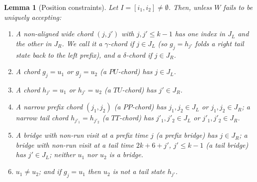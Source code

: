 \documentclass[11pt]{article}
\newtheorem{lemma}[theorem]{Lemma}
\theoremstyle{definition}
\begin{document}
\begin{lemma}[Position constraints]\label{lem:positions}
Let $I=[i_1,i_2]\ne\emptyset$. Then, unless $W$ fails to be uniquely
accepting:
\begin{enumerate}[leftmargin=2.2em,itemsep=2pt,label=(\alph*)]
\item A non-aligned wide chord $(j,j')$ with $j,j'\le k-1$ has one index in
$J_L$ and the other in $J_R$. We call it a \emph{$\gamma$-chord} if $j\in J_L$
(so $g_j=h_{j'}$ folds a right tail state back to the left prefix), and a
\emph{$\delta$-chord} if $j\in J_R$.
\item A chord $g_j=u_1$ or $g_j=u_2$ (a \emph{$PU$-chord}) has $j\in J_L$.
\item A chord $h_{j'}=u_1$ or $h_{j'}=u_2$ (a \emph{$TU$-chord}) has $j'\in J_R$.
\item A narrow prefix chord $(j_1,j_2)$ (a \emph{$PP$-chord}) has $j_1,j_2\in J_L$
or $j_1,j_2\in J_R$; a narrow tail chord $h_{j'_1}=h_{j'_2}$ (a
\emph{$TT$-chord}) has $j'_1,j'_2\in J_L$ or $j'_1,j'_2\in J_R$.
\item A bridge with non-run visit at a prefix time $j$ (a \emph{prefix bridge})
has $j\in J_R$; a bridge with non-run visit at a tail time $2k+6+j'$,
$j'\le k-1$ (a \emph{tail bridge}) has $j'\in J_L$; neither $u_1$ nor $u_2$
is a bridge.
\item $u_1\ne u_2$; and if $g_j=u_1$ then $u_2$ is not a tail state
$h_{j'}$.
\end{enumerate}
\end{lemma}
\end{document}
